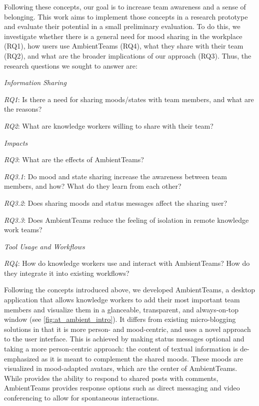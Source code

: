 Following these concepts, our goal is to increase team awareness and a sense of belonging. This work aims to implement those concepts in a research prototype and evaluate their potential in a small preliminary evaluation. To do this, we investigate whether there is a general need for mood sharing in the workplace (RQ1), how users use AmbientTeams (RQ4), what they share with their team (RQ2), and what are the broader implications of our approach (RQ3). Thus, the research questions we sought to answer are:

\bigskip\noindent\textit{Information Sharing}

\smallskip\noindent\textit{RQ1}: Is there a need for sharing moods/states with team members, and what are the reasons?

\smallskip\noindent\textit{RQ2}: What are knowledge workers willing to share with their team?

\medskip\noindent\textit{Impacts}

\smallskip\noindent\textit{RQ3}: What are the effects of AmbientTeams?

\setlength{\leftskip}{0.5cm}
\smallskip\noindent\textit{RQ3.1}: Do mood and state sharing increase the awareness between team members, and how? What do they learn from each other?

\smallskip\noindent\textit{RQ3.2}: Does sharing moods and status messages affect the sharing user?


\smallskip\noindent\textit{RQ3.3}: Does AmbientTeams reduce the feeling of isolation in remote knowledge work teams?

\setlength{\leftskip}{0pt}

\medskip\noindent\textit{Tool Usage and Workflows}

\smallskip\noindent\textit{RQ4}: How do knowledge workers use and interact with AmbientTeams? How do they integrate it into existing workflows?


\bigskip\noindent Following the concepts introduced above, we developed AmbientTeams, a desktop application that allows knowledge workers to add their most important team members and visualize them in a glanceable, transparent, and always-on-top window (see \autoref{fig:at_ambient_intro}). It differs from existing micro-blogging solutions in that it is more person- and mood-centric, and uses a novel approach to the user interface. This is achieved by making status messages optional and taking a more person-centric approach: the content of textual information is de-emphasized as it is meant to complement the shared moods. These moods are visualized in mood-adapted avatars, which are the center of AmbientTeams. While \textcite{dullemond2013fixing} provides the ability to respond to shared posts with comments, AmbientTeams provides response options such as direct messaging and video conferencing to allow for spontaneous interactions. 

